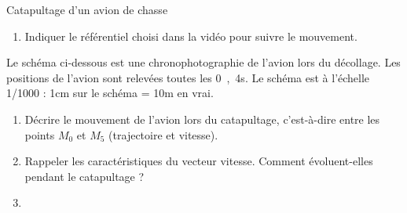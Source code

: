 \documentclass[12pt,a4paper]{article}
\begin{document}
\begin{exo}{Catapultage d'un avion de chasse}
\begin{enumerate}
\item \anarai{} 

Indiquer le référentiel choisi dans la vidéo pour suivre le mouvement.
\end{enumerate}

Le schéma ci-dessous est une chronophotographie de l'avion lors du décollage.
Les positions de l'avion sont relevées toutes les \unit{0{,}4}{s}.
Le schéma est à l'échelle 1/1000 : \unit{1}{cm} sur le schéma = \unit{10}{m} en vrai.

\begin{center}
\end{center}

\begin{enumerate}[resume]
\item \rco{} 

Décrire le mouvement de l'avion lors du catapultage, c'est-à-dire entre les points $M_0$ et $M_5$ (trajectoire et vitesse).

\item \rco{}  \anarai{} 

Rappeler les caractéristiques du vecteur vitesse.
Comment évoluent-elles pendant le catapultage ?



\item \rea{} 


\end{enumerate}
\end{exo}
\end{document}
